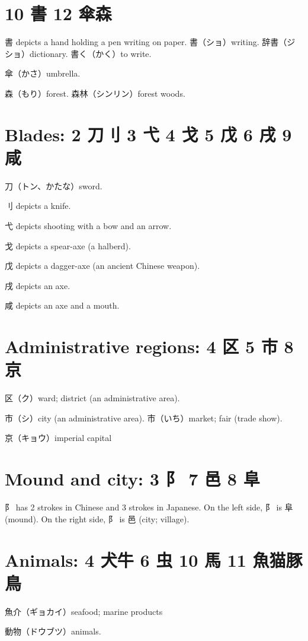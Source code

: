 \section{10 書 12 傘森}

書 depicts a hand holding a pen writing on paper.
書（ショ）writing.
辞書（ジショ）dictionary.
書く（かく）to write.

傘（かさ）umbrella.

森（もり）forest.
森林（シンリン）forest woods.

\section{Blades: 2 刀刂 3 弋 4 戈 5 戊 6 戌 9 咸}

刀（トン、かたな）sword.

刂 depicts a knife.

弋 depicts shooting with a bow and an arrow.

戈 depicts a spear-axe (a halberd).

戊 depicts a dagger-axe (an ancient Chinese weapon).

戌 depicts an axe.

咸 depicts an axe and a mouth.

\section{Administrative regions: 4 区 5 市 8 京}

区（ク）ward; district (an administrative area).

市（シ）city (an administrative area).
市（いち）market; fair (trade show).

京（キョウ）imperial capital

\section{Mound and city: 3 阝 7 邑 8 阜}

阝 has 2 strokes in Chinese and 3 strokes in Japanese.
On the left side, 阝 is 阜 (mound).
On the right side, 阝 is 邑 (city; village).

\section{Animals: 4 犬牛 6 虫 10 馬 11 魚猫豚鳥}

魚介（ギョカイ）seafood; marine products

動物（ドウブツ）animals.

